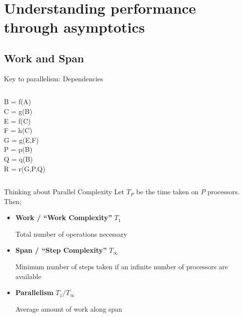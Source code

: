 \documentclass[english,compress]{beamer}
\begin{document}
\section[Asymptotics]{Understanding performance through asymptotics}
\subsection{Work and Span}
{
\begin{frame}{Key to parallelism: Dependencies}
  \begin{columns}
      B = f(A)\\
      C = g(B)\\
      E = f(C)\\
      F = h(C)\\
      G = g(E,F)\\
      P = p(B)\\
      Q = q(B)\\
      R = r(G,P,Q)
    \uncover<+->{}
    \uncover<+->{
      \begin{center}
        
      \end{center}
    }
  \end{columns}
\end{frame}
}
\begin{frame}{Thinking about Parallel Complexity}
  Let $T_P$ be the time taken on $P$ processors. Then;
  \begin{itemize}
    \item \textbf{Work / ``Work Complexity''} $T_1$

      Total number of operations necessary
    \item \textbf{Span / ``Step Complexity''} $T_\infty$

      Minimum number of steps taken if an infinite number of processors are available
    \item \textbf{Parallelism} $T_1/T_\infty$

      Average amount of work along span
  \end{itemize}
  \uncover<+->{}
\end{frame}
\end{document}
